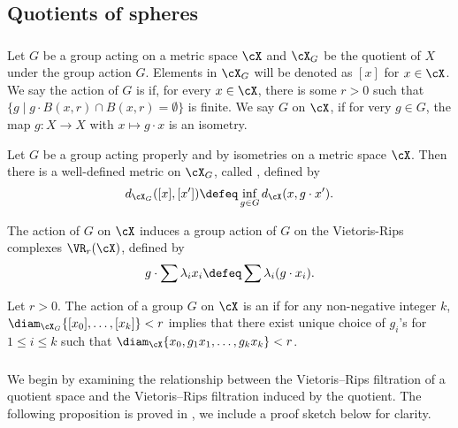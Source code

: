 \subsection{Quotients of spheres}

\subsubsection{}


Let $G$ be a group acting on a metric space $\cX$ and $\cX_G$ be the quotient of $X$ under the group action $G$. 
Elements in $\cX_G$ will be denoted as $[x]$ for $x\in \cX$.
We say the action of $G$ is  if, for every $x\in \cX$, there is some $r>0$ such that $\{g \mid g\cdot B(x,r)\cap B(x,r)=\emptyset\}$ is finite. 
We say $G$  on $\cX$, if for very $g\in G$, the map $g:X\to X$ with $x\mapsto g\cdot x$ is an isometry.

Let $G$ be a group acting properly and by isometries on a metric space $\cX$.
Then there is a well-defined metric on $\cX_G$, called , defined by 
\[
    d_{\cX_G}([x], [x']) \defeq \inf_{g\in G} d_\cX(x, g\cdot x').
\]

The action of $G$ on $\cX$ induces a group action of $G$ on the Vietoris-Rips complexes $\VR_r(\cX)$, defined by
\[
    g \cdot \sum \lambda_i x_i \defeq \sum \lambda_i (g\cdot x_i).
\]

Let $r>0$. The action of a group $G$ on $\cX$ is an  if for any non-negative integer $k$, $\diam_{\cX_G}\{[x_0],\dots,[x_k]\}<r$ implies that there exist unique choice of $g_i$'s for $1\leq i\leq k$ such that $\diam_{\cX}\{x_0,g_1x_1,\dots,g_kx_k\}<r$. 

\subsubsection{}\label{subsub:h}

We begin by examining the relationship between the Vietoris--Rips filtration of a quotient space and the Vietoris--Rips filtration induced by the quotient.
The following proposition is proved in \cite[Proposition 3.5]{adams2022metric}, we include a proof sketch below for clarity.

